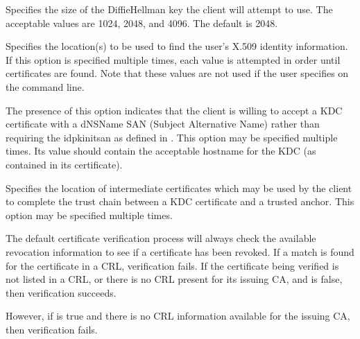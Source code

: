 \documentclass[letterpaper,10pt,english]{sphinxmanual}
\begin{document}
\begin{description}
\begin{description}
\end{description}

\item[{\sphinxstylestrong{pkinit\_dh\_min\_bits}}] \leavevmode
\sphinxAtStartPar
Specifies the size of the Diffie\sphinxhyphen{}Hellman key the client will
attempt to use.  The acceptable values are 1024, 2048, and 4096.
The default is 2048.

\item[{\sphinxstylestrong{pkinit\_identities}}] \leavevmode
\sphinxAtStartPar
Specifies the location(s) to be used to find the user’s X.509
identity information.  If this option is specified multiple times,
each value is attempted in order until certificates are found.
Note that these values are not used if the user specifies
 on the command line.

\item[{\sphinxstylestrong{pkinit\_kdc\_hostname}}] \leavevmode
\sphinxAtStartPar
The presence of this option indicates that the client is willing
to accept a KDC certificate with a dNSName SAN (Subject
Alternative Name) rather than requiring the id\sphinxhyphen{}pkinit\sphinxhyphen{}san as
defined in .  This option may be specified multiple
times.  Its value should contain the acceptable hostname for the
KDC (as contained in its certificate).

\item[{\sphinxstylestrong{pkinit\_pool}}] \leavevmode
\sphinxAtStartPar
Specifies the location of intermediate certificates which may be
used by the client to complete the trust chain between a KDC
certificate and a trusted anchor.  This option may be specified
multiple times.

\item[{\sphinxstylestrong{pkinit\_require\_crl\_checking}}] \leavevmode
\sphinxAtStartPar
The default certificate verification process will always check the
available revocation information to see if a certificate has been
revoked.  If a match is found for the certificate in a CRL,
verification fails.  If the certificate being verified is not
listed in a CRL, or there is no CRL present for its issuing CA,
and  is false, then verification
succeeds.

\sphinxAtStartPar
However, if  is true and there is
no CRL information available for the issuing CA, then verification
fails.


\end{description}
\end{document}
